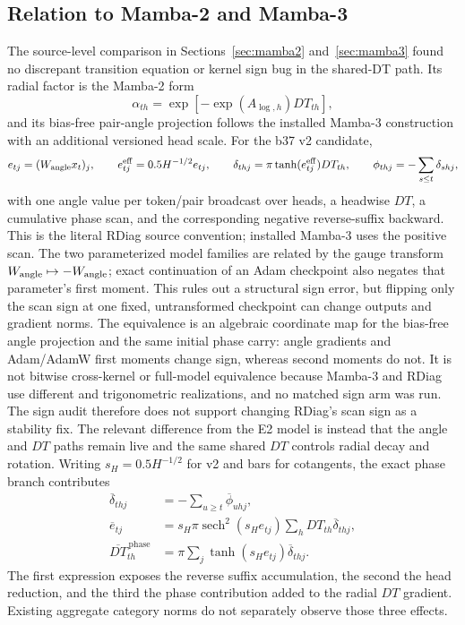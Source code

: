 \documentclass[11pt]{article}
\let\pathcode\path
\begin{document}
\subsection{Relation to Mamba-2 and Mamba-3}

The source-level comparison in Sections~\ref{sec:mamba2} and~\ref{sec:mamba3} found no discrepant
transition equation or kernel sign bug in the shared-DT path.  Its radial factor is the Mamba-2
form
\begin{equation}
  \alpha_{th}=\exp\!\left[-\exp(A_{\log,h})DT_{th}\right],
\end{equation}
and its bias-free pair-angle projection follows the installed Mamba-3 construction with an
additional versioned head scale.  For the b37 v2 candidate,
\begin{equation}
  e_{tj}=(W_{\rm angle}x_t)_j,\qquad
  e^{\rm eff}_{tj}=0.5H^{-1/2}e_{tj},\qquad
  \delta_{thj}=\pi\tanh(e^{\rm eff}_{tj})DT_{th},
  \qquad
  \phi_{thj}=-\sum_{s\leq t}\delta_{shj},
  \label{eq:shared-dt-phase}
\end{equation}
with one angle value per token/pair broadcast over heads, a headwise $DT$, a cumulative phase scan,
and the corresponding negative reverse-suffix backward.  This is the literal RDiag source
convention; installed Mamba-3 uses the positive scan.  The two parameterized model families are
related by the gauge transform $W_{\rm angle}\mapsto-W_{\rm angle}$; exact continuation of an Adam
checkpoint also negates that parameter's first moment.  This rules out a structural sign error, but
flipping only the scan sign at one fixed, untransformed checkpoint can change outputs and gradient
norms.
The equivalence is an algebraic coordinate map for the bias-free angle projection and the same
initial phase carry: angle gradients and Adam/AdamW first moments change sign, whereas second
moments do not.  It is not bitwise cross-kernel or full-model equivalence because Mamba-3 and RDiag
use different \pathcode{tanh} and trigonometric realizations, and no matched sign arm was run.  The
sign audit therefore does not support changing RDiag's scan sign as a stability fix.
The relevant difference from the E2 model is instead that the angle and $DT$ paths remain live and
the same shared $DT$ controls radial decay and rotation.
Writing $s_H=0.5H^{-1/2}$ for v2 and bars for cotangents, the exact phase branch contributes
\begin{align}
  \overline{\delta}_{thj}
    &=-\sum_{u\geq t}\overline{\phi}_{uhj},\\
  \overline e_{tj}
    &=s_H\pi\operatorname{sech}^2(s_He_{tj})
      \sum_h DT_{th}\overline{\delta}_{thj},\\
  \overline{DT}^{\,\mathrm{phase}}_{th}
    &=\pi\sum_j\tanh(s_He_{tj})\overline{\delta}_{thj}.
  \label{eq:shared-dt-vjp}
\end{align}
The first expression exposes the reverse suffix accumulation, the second the head reduction, and
the third the phase contribution added to the radial $DT$ gradient.  Existing aggregate category
norms do not separately observe those three effects.
\end{document}
